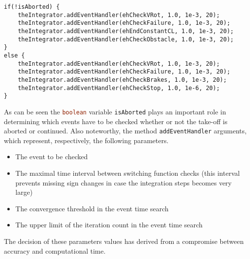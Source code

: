 \bigskip
\begin{lstlisting}[caption={HighamHall54Integrator class object creation}, captionpos=b, tabsize=2]
if(!isAborted) {
	theIntegrator.addEventHandler(ehCheckVRot, 1.0, 1e-3, 20);
	theIntegrator.addEventHandler(ehCheckFailure, 1.0, 1e-3, 20);
	theIntegrator.addEventHandler(ehEndConstantCL, 1.0, 1e-3, 20);
	theIntegrator.addEventHandler(ehCheckObstacle, 1.0, 1e-3, 20);
}
else {
	theIntegrator.addEventHandler(ehCheckVRot, 1.0, 1e-3, 20);
	theIntegrator.addEventHandler(ehCheckFailure, 1.0, 1e-3, 20);
	theIntegrator.addEventHandler(ehCheckBrakes, 1.0, 1e-3, 20);
	theIntegrator.addEventHandler(ehCheckStop, 1.0, 1e-6, 20);
}
\end{lstlisting}
%
As can be seen the \lstinline[language=Java]!boolean! variable \lstinline[language=Java]!isAborted! plays an important role in determining which events have to be checked whether or not the take-off is aborted or continued. Also noteworthy, the method \lstinline[language=Java]!addEventHandler! arguments, which represent, respectively, the following parameters.
%
\begin{itemize}
\item The event to be checked
\item The maximal time interval between switching function checks (this interval prevents missing sign changes in case the integration steps becomes very large)
\item The convergence threshold in the event time search
\item The upper limit of the iteration count in the event time search
\end{itemize}
%
The decision of these parameters values has derived from a compromise between accuracy and computational time.

